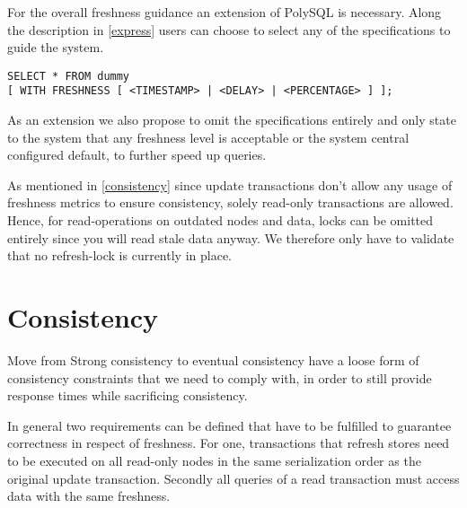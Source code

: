 For the overall freshness guidance an extension of PolySQL is necessary.
Along the description in \ref{express} users can choose to select any of the specifications to guide the system.
\begin{verbatim}
SELECT * FROM dummy 
[ WITH FRESHNESS [ <TIMESTAMP> | <DELAY> | <PERCENTAGE> ] ];
\end{verbatim}
As an extension we also propose to omit the specifications entirely and only state to the system that any freshness level is acceptable or the system central
configured default, to further speed up queries.



As mentioned in \ref{consistency} since update transactions don't allow any usage of freshness metrics to ensure consistency, solely read-only transactions are allowed.
Hence, for read-operations on outdated nodes and data, locks can be omitted entirely since you will read stale data anyway.
We therefore only have to validate that no refresh-lock is currently in place.








\section{Consistency}
\label{sec:consistency_concept}


Move from Strong consistency to eventual consistency 
have a loose form of consistency constraints that we need to comply with, in order to still provide response times while sacrificing consistency.

In general two requirements can be defined that have to be fulfilled to
guarantee correctness in respect of freshness. For one, transactions that refresh stores need to be executed on all read-only nodes in the same serialization order as the 
original update transaction. Secondly all queries of a read transaction must access data with the same freshness. 

